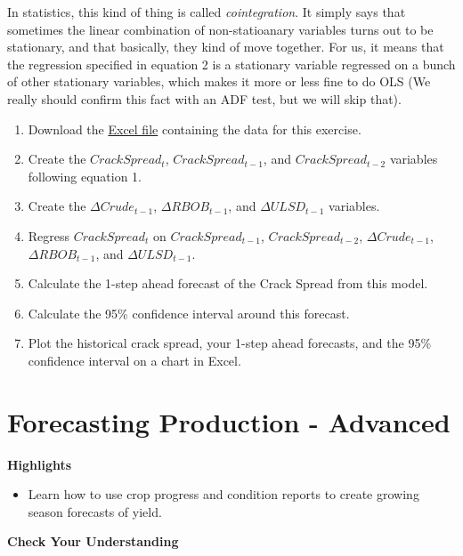 \documentclass[
  letterpaper,
  DIV=11,
  numbers=noendperiod]{scrreprt}
\providecommand{\tightlist}{%
  \setlength{\itemsep}{0pt}\setlength{\parskip}{0pt}}\usepackage{longtable,booktabs,array}
\begin{document}
In statistics, this kind of thing is called \emph{cointegration}. It
simply says that sometimes the linear combination of non-statioanary
variables turns out to be stationary, and that basically, they kind of
move together. For us, it means that the regression specified in
equation 2 is a stationary variable regressed on a bunch of other
stationary variables, which makes it more or less fine to do OLS (We
really should confirm this fact with an ADF test, but we will skip
that).

\begin{enumerate}
\def\labelenumi{\arabic{enumi}.}
\item
  Download the \href{Excel-files/CrackSpread.csv}{Excel file} containing
  the data for this exercise.
\item
  Create the \(CrackSpread_t\), \(CrackSpread_{t-1}\), and
  \(CrackSpread_{t-2}\) variables following equation 1.
\item
  Create the \(\Delta Crude_{t-1}\), \(\Delta RBOB_{t-1}\), and
  \(\Delta ULSD_{t-1}\) variables.
\item
  Regress \(CrackSpread_t\) on \(CrackSpread_{t-1}\),
  \(CrackSpread_{t-2}\), \(\Delta Crude_{t-1}\), \(\Delta RBOB_{t-1}\),
  and \(\Delta ULSD_{t-1}\).
\item
  Calculate the 1-step ahead forecast of the Crack Spread from this
  model.
\item
  Calculate the 95\% confidence interval around this forecast.
\item
  Plot the historical crack spread, your 1-step ahead forecasts, and the
  95\% confidence interval on a chart in Excel.
\end{enumerate}


\hypertarget{forecasting-production---advanced}{%
\chapter{Forecasting Production -
Advanced}\label{forecasting-production---advanced}}

\textbf{Highlights}

\begin{itemize}
\tightlist
\item
  Learn how to use crop progress and condition reports to create growing
  season forecasts of yield.
\end{itemize}

\textbf{Check Your Understanding}
\end{document}
